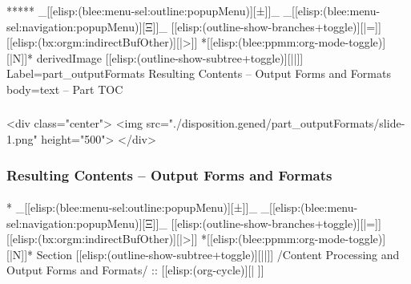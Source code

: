 \begin{whenOrg}
\begin{whenOrg}
*****  _[[elisp:(blee:menu-sel:outline:popupMenu)][±]]_ _[[elisp:(blee:menu-sel:navigation:popupMenu)][Ξ]]_ [[elisp:(outline-show-branches+toggle)][|=]] [[elisp:(bx:orgm:indirectBufOther)][|>]] *[[elisp:(blee:ppmm:org-mode-toggle)][|N]]*  derivedImage [[elisp:(outline-show-subtree+toggle)][||]] Label=part_outputFormats Resulting Contents -- Output Forms and Formats body=text -- Part TOC
\end{whenOrg}

\begin{htmlonly}

\begin{frame}[fragile,plain,label=part_outputFormats]
    \frametitle{}
    \framesubtitle{}
    \begin{rawhtml}
<div class="center">
<img src="./disposition.gened/part_outputFormats/slide-1.png" height="500">
</div>
    \end{rawhtml}
\end{frame}
\end{htmlonly}

\begin{verblatex}

\begin{frame}[fragile,label=part_outputFormats]
    \frametitle{Resulting Contents -- Output Forms and Formats}
    \framesubtitle{}

    \tableofcontents


\end{frame}
\end{verblatex}



\begin{whenOrg}
*  _[[elisp:(blee:menu-sel:outline:popupMenu)][±]]_ _[[elisp:(blee:menu-sel:navigation:popupMenu)][Ξ]]_ [[elisp:(outline-show-branches+toggle)][|=]] [[elisp:(bx:orgm:indirectBufOther)][|>]] *[[elisp:(blee:ppmm:org-mode-toggle)][|N]]*  Section    [[elisp:(outline-show-subtree+toggle)][||]]   /Content Processing and Output Forms and Formats/ ::  [[elisp:(org-cycle)][| ]]
\end{whenOrg}


\end{whenOrg}
